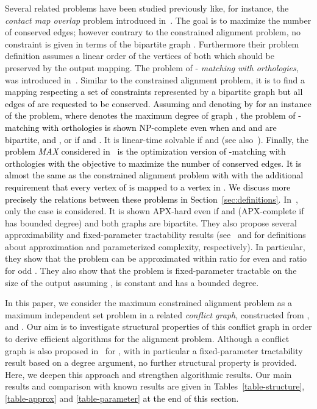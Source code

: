 \documentclass[final]{dmtcs-episciences}
\newcommand\mar[1]{\textcolor{black}{#1}}
\begin{document}
Several related problems have been studied previously like, 
for instance, the {\em contact map overlap} problem introduced in~\citet{Goldman1999}. The goal  is to maximize the number of conserved edges;
however 
contrary to the constrained alignment problem, no constraint is given in terms of the bipartite graph . Furthermore their problem definition assumes a linear order of the vertices of both 
which should be preserved by the output mapping. 
The problem 
of -\emph{ matching with orthologies}, was introduced in~\citet{Fagnot2008}. Similar to the constrained alignment problem, it is to find a mapping \mar{respecting a set of constraints} represented by a bipartite graph  \mar{but all edges of  are requested to be conserved. 
Assuming  and denoting by  
  for an instance of the problem, where  denotes the maximum degree of graph , the problem of -{matching with orthologies} is shown NP-complete 
even when  and  and  are bipartite,  and , or if  and .} It is linear-time solvable if  and   (see also~\citet{Fertin200990}). \mar{Finally,  
 the problem  \emph{ MAX} considered in~\citet{Fertin200990} is the optimization version of -{matching with orthologies} with the objective to maximize the number of conserved edges. It is almost the same as the constrained alignment problem with  with the additional requirement that every vertex of  is  mapped to a vertex in . We discuss more precisely the relations between these problems in Section~\ref{sec:definitions}}.  
 In~\citet{Fertin200990},   
 only the case  is considered.  
It is shown APX-hard even if  and  (APX-complete if   has bounded degree) and both graphs are bipartite.  They also propose several approximability and 
fixed-parameter tractability results (see~\citet{ausiellobook} and \citet{ParameterizedComplexity} for definitions about approximation and parameterized complexity, respectively). In particular,
they show that the problem can be approximated within ratio 
for even  and ratio  for odd 
. They also show that the problem is fixed-parameter tractable 
on the size of the output assuming ,  is constant and  has a bounded degree.



In this paper, we consider the maximum constrained alignment problem as a maximum independent set  problem in a related  \emph{ conflict graph}, constructed from , and . Our aim is to investigate structural properties of this conflict graph in order to derive efficient  algorithms for the alignment problem. Although  
a conflict graph is also proposed in~\citet{Fertin200990} for , with in particular a fixed-parameter tractability result based on a degree argument, no further structural property is provided. Here, we deepen this approach and strengthen algorithmic results.
Our main results and comparison with known results are given in Tables~\ref{table-structure},  \ref{table-approx} and \ref{table-parameter} \mar{at the end of this section}. 
\end{document}
